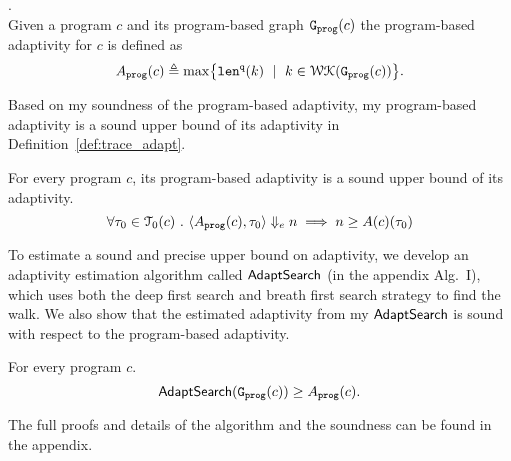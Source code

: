  \begin{defn}
 .
 \label{def:prog_adapt}
 \\
 {
 Given a program ${c}$ and its program-based graph 
 $\mathtt{{G_{prog}}}({c})$
 the program-based adaptivity for $c$ is 
 defined as%
 \[
 \progA({c})
 \triangleq \max
 \left\{ \qlen(k) \ \mid \  k\in \walks(\progG({c}))\right \}.
 \]
 }
 \end{defn}
 Based on my soundness of the program-based adaptivity, my program-based adaptivity is a sound upper bound of its adaptivity in Definition~\ref{def:trace_adapt}. 
 \begin{thm}
     \label{thm:sound_progadapt}
     For every program $c$, 
     its program-based adaptivity is a sound upper bound of its adaptivity.
      $$ \forall \mathtt{\tau}_0 \in \mathcal{T}_{0}(c) ~.~ 
 \langle A_{\mathtt{prog}}(c), \mathtt{\tau}_0 \rangle \Downarrow_e n \implies n \geq A(c)(\mathtt{\tau}_0) $$
 \end{thm}
 To estimate a sound and precise upper bound on adaptivity, we develop an adaptivity estimation algorithm called $\mathsf{AdaptSearch}$ (in the appendix Alg.~I), which uses both the deep first search and breath first search strategy to find the walk. We also show that the estimated adaptivity from my $\mathsf{AdaptSearch}$ is sound with respect to the program-based adaptivity. 
 \begin{thm}
     \label{thm:sound_adaptalg}
     For every program $c$.
      $$\mathsf{AdaptSearch}(\mathtt{{G_{prog}}}({c})) \geq A_{\mathtt{prog}}(c).$$
 \end{thm}
 The full proofs and details of the algorithm and the soundness can be found in the appendix.
 

